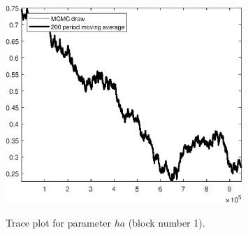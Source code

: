 \begin{figure}[H]
\centering
  \includegraphics[width=0.8\textwidth]{BRS_growth_util_sectoral/graphs/TracePlot_ha_blck_1}\\
    \caption{Trace plot for parameter ${ha}$ (block number 1).}
\end{figure}
